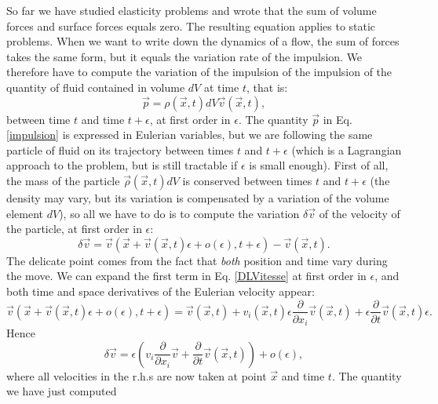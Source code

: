 \documentclass[DIV=12]{article}
\begin{document}
So far we have studied elasticity problems and wrote that the sum of volume  forces
 and surface forces equals zero. The resulting equation applies to static problems. When
 we want to write down the dynamics of a flow, the sum of forces 
 takes the same form, but it equals the variation rate of the impulsion.
 We therefore have to compute the variation of the impulsion of 
 the impulsion of the quantity of fluid contained in volume $dV$ at time $t$, that is:
\begin{equation}
 \vec{p} = \rho(\vec{x},t) dV \vec{v}(\vec{x},t),
 \label{impulsion}
\end{equation}
 between time $t$ and time $t+\epsilon$, at first order in $\epsilon$.
 The quantity $\vec{p}$ in Eq. \ref{impulsion} is expressed in Eulerian variables,
 but we are following the same particle of fluid on its trajectory between times
 $t$ and $t+\epsilon$ (which is a Lagrangian approach to the problem, but is still tractable 
 if $\epsilon$ is small enough). First of all, the mass of the particle $\vec{\rho}(\vec{x},t) dV$
 is conserved between times $t$ and $t+\epsilon$ (the density may vary, but its variation is compensated 
by a variation of the volume element $dV$), so all we have to do is to compute the 
variation $\delta\vec{v}$ of the velocity of the particle, at first order in $\epsilon$:
\begin{equation}
\delta \vec{v} = \vec{v}( \vec{x} + \vec{v}( \vec{x}, t ) \epsilon + o(\epsilon) ,t + \epsilon) - \vec{v}( \vec{x},t). 
\label{DLVitesse} 
\end{equation}
 The delicate point comes from the fact that {\emph{both}} position and time vary during the move. We can expand 
 the first term in Eq. \ref{DLVitesse} at first order in $\epsilon$, and both time and space derivatives of the
Eulerian velocity appear:
\begin{equation}
\vec{v}( \vec{x} + \vec{v}( \vec{x}, t ) \epsilon + o(\epsilon) ,t + \epsilon) = \vec{v}( \vec{x},t) +  v_i( \vec{x},t ) \epsilon \frac{\partial }{\partial x_i} \vec{v}( \vec{x}, t ) + \epsilon \frac{\partial}{\partial t} \vec{v}(\vec{x},t) \epsilon. 
\end{equation}
Hence 
\begin{equation}\delta \vec{v} =  \epsilon\left( v_i   \frac{\partial }{\partial x_i} \vec{v} +  \frac{\partial}{\partial t} \vec{v}(\vec{x},t) \right) + o(\epsilon),
\label{DLVitesse} 
\end{equation}
 where all velocities in the r.h.s are now taken at point $\vec{x}$ and time $t$. The quantity we have just computed 
\end{document}
